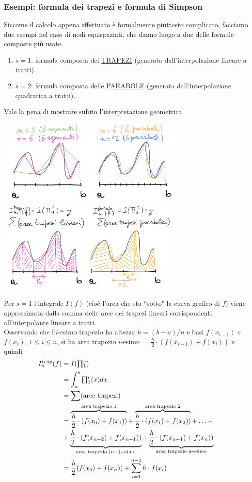 \subsubsection{Esempi: formula dei trapezi e formula di Simpson}
Siccome il calcolo appena effettuato è formalmente piuttosto complicato, facciamo due esempi nel caso di nodi equispaziati, che danno luogo a due delle formule composte più usate.
\begin{enumerate}
    \item $s=1$: formula composta dei \uline{TRAPEZI} (generata dall'interpolazione lineare a tratti).
    \item $s=2$: formula composta delle \uline{PARABOLE} (generata dall'interpolazione quadratica a tratti).
\end{enumerate}
Vale la pena di mostrare subito l'interpretazione geometrica
\begin{center}
    \includegraphics[width=0.7\textwidth]{foto/pag17}
    \includegraphics[width=0.7\textwidth]{foto/pag18}
\end{center}
Per $s=1$ l'integrale $I(f)$ (cioè l'area che sta ``sotto" la curva grafico di $f$) viene approssimata dalla somma delle aree dei trapezi lineari corrispondenti all'interpolante lineare a tratti.\\
Osservando che l'$i$-esimo trapezio ha altezza $h=(b-a)/n$ e basi $f(x_{i-1})$ e $f(x_i)$, $1 \leq i \leq n$, si ha area trapezio $i$-esimo $= \frac{h}{2} \cdot (f(x_{i-1}) + f(x_i))$ e quindi
\[
\begin{split}
    I_n^{trap} (f) & = I(\begin{matrix}\prod\end{matrix}_1^c) \\
    & = \int_a^b \begin{matrix}\prod\end{matrix}_1^c (x) dx \\
    & = \sum (\text{aree trapezi}) \\
    & = \overbrace{\frac{h}{2} \cdot (f(x_0) + f(x_1))}^{\text{area trapezio 1}} + \overbrace{\frac{h}{2} \cdot (f(x_1) + f(x_2))}^{\text{area trapezio 2}} + \dotso + \\
    & + \underbrace{\frac{h}{2} \cdot (f(x_{n-2}) + f(x_{n-1}))}_{\text{area trapezio (n-1)-esimo}} + \underbrace{\frac{h}{2} \cdot (f(x_{n-1}) + f(x_n))}_{\text{area trapezio n-esimo}} \\ 
    & =\frac{h}{2} (f(x_0) + f(x_n)) + \sum_{i=1}^{n-1} h \cdot f(x_i)
\end{split}
\]
